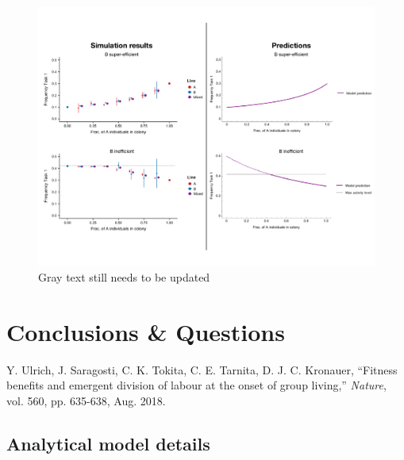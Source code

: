 \documentclass[11pt]{article}
\begin{document}
\begin{figure}[H]
    \centering
    \includegraphics[trim={0 1in 0 1.1in},clip,width=0.9\linewidth]{mixes_comparison.pdf}
    \caption{Gray text still needs to be updated}
    \label{fig:mixescomp}
\end{figure}

\section{Conclusions \& Questions} \label{sec:conclusions}


\begin{thebibliography}{99}

 Y. Ulrich, J. Saragosti, C. K. Tokita, C. E. Tarnita, D. J. C. Kronauer, ``Fitness benefits and emergent division of labour at the onset of group living,'' \textit{Nature}, vol. 560, pp. 635-638, Aug. 2018.

\end{thebibliography}

\begin{appendices}

\section{Analytical model details}

\end{appendices}
\end{document}
